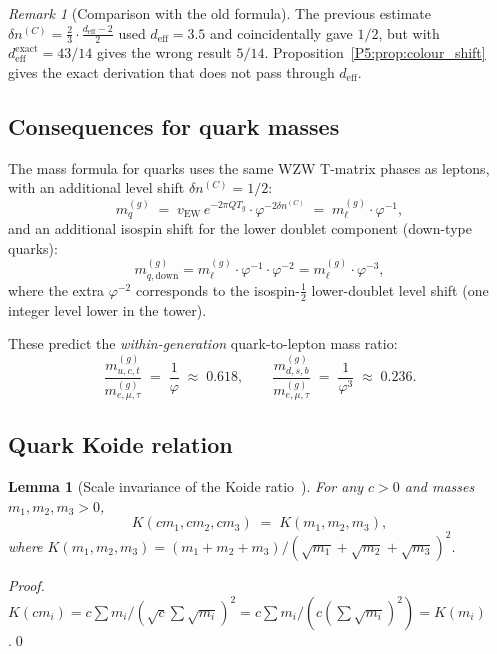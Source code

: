 \documentclass[11pt,a4paper]{article}
\newtheorem{lemma}[theorem]{Lemma}
\theoremstyle{definition}
\theoremstyle{remark}
\newtheorem{remark}[theorem]{Remark}
\newcommand{\vp}{\varphi}
\newcommand{\deff}{d_{\mathrm{eff}}}
\begin{document}
\begin{remark}[Comparison with the old formula]
\label{P5:rem:old_formula_comparison}
The previous estimate $\delta n^{(C)} = \tfrac{2}{3}\cdot\tfrac{\deff-2}{2}$
used $\deff = 3.5$ and coincidentally gave $1/2$, but with
$\deff^{\mathrm{exact}}=43/14$ gives the wrong result $5/14$.
Proposition~\ref{P5:prop:colour_shift} gives the exact derivation that
does not pass through $\deff$.
\end{remark}

\subsection{Consequences for quark masses}

The mass formula for quarks uses the same WZW T-matrix phases as leptons,
with an additional level shift $\delta n^{(C)}=1/2$:
\begin{equation}
  m_q^{(g)} \;=\; v_{\mathrm{EW}}\,e^{-2\pi Q T_g}\cdot\vp^{-2\delta n^{(C)}}
              \;=\; m_\ell^{(g)}\cdot\vp^{-1},
  \label{P5:eq:quark_mass_formula}
\end{equation}
and an additional isospin shift for the lower doublet component
(down-type quarks):
\begin{equation}
  m_{q,\mathrm{down}}^{(g)}
  = m_\ell^{(g)}\cdot\vp^{-1}\cdot\vp^{-2}
  = m_\ell^{(g)}\cdot\vp^{-3},
  \label{P5:eq:down_quark_mass}
\end{equation}
where the extra $\vp^{-2}$ corresponds to the isospin-$\tfrac{1}{2}$
lower-doublet level shift (one integer level lower in the tower).

These predict the \emph{within-generation} quark-to-lepton mass ratio:
\begin{equation}
  \frac{m_{u,c,t}^{(g)}}{m_{e,\mu,\tau}^{(g)}}
  \;=\; \frac{1}{\vp}
  \;\approx\; 0.618,
  \qquad
  \frac{m_{d,s,b}^{(g)}}{m_{e,\mu,\tau}^{(g)}}
  \;=\; \frac{1}{\vp^3}
  \;\approx\; 0.236.
  \label{P5:eq:quark_lepton_ratio}
\end{equation}

\subsection{Quark Koide relation}
\label{P5:subsec:quark_koide}

\begin{lemma}[Scale invariance of the Koide ratio~\cite{Koide1983}]
\label{P5:lem:koide_scale}
For any $c>0$ and masses $m_1,m_2,m_3>0$,
\begin{equation}
  K(cm_1,cm_2,cm_3) \;=\; K(m_1,m_2,m_3),
  \label{P5:eq:koide_scale}
\end{equation}
where $K(m_1,m_2,m_3) = (m_1+m_2+m_3)/(\sqrt{m_1}+\sqrt{m_2}+\sqrt{m_3})^2$.
\end{lemma}
\begin{proof}
$K(cm_i)= c\sum m_i/(\sqrt{c}\sum\sqrt{m_i})^2 = c\sum m_i/(c(\sum\sqrt{m_i})^2) = K(m_i)$.\qed
\end{proof}
\end{document}
